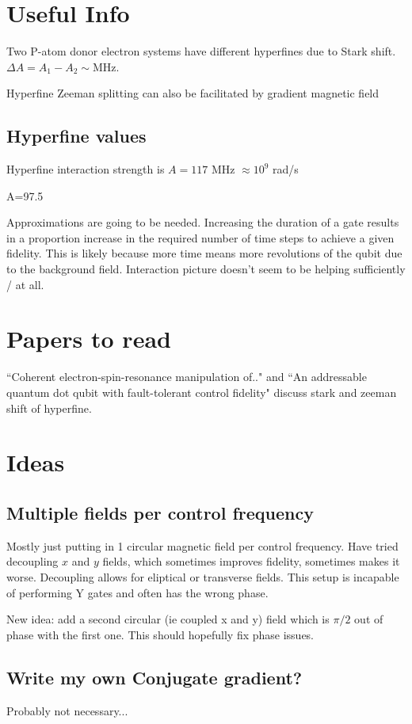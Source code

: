 \documentclass[12pt]{article}
\begin{document}
\section{Useful Info}
Two P-atom donor electron systems have different hyperfines due to Stark shift. $\Delta A = A_1-A_2\sim $MHz.\cite{kalra_robust_2014}

Hyperfine Zeeman splitting can also be facilitated by gradient magnetic field

\subsection{Hyperfine values}
Hyperfine interaction strength is $A=117$ MHz $\approx 10^9 $ rad/s\cite{mccamey_fast_2009}

A=97.5\  \cite{hile_addressable_2018}

Approximations are going to be needed. Increasing the duration of a gate results in a proportion increase in the required number of time steps to achieve a given fidelity. This is likely because more time means more revolutions of the qubit due to the background field. Interaction picture doesn't seem to be helping sufficiently / at all.

\section{Papers to read}
``Coherent electron-spin-resonance manipulation of.." and ``An addressable quantum dot qubit with fault-tolerant control fidelity" discuss stark and zeeman shift of hyperfine.


\section{Ideas}
\subsection{Multiple fields per control frequency}
Mostly just putting in 1 circular magnetic field per control frequency. Have tried decoupling $x$ and $y$ fields, which sometimes improves fidelity, sometimes makes it worse. Decoupling allows for eliptical or transverse fields. This setup is incapable of performing Y gates and often has the wrong phase.

New idea: add a second circular (ie coupled x and y) field which is $\pi/2$ out of phase with the first one. This should hopefully fix phase issues.

\subsection{Write my own Conjugate gradient?}
Probably not necessary...
\end{document}
